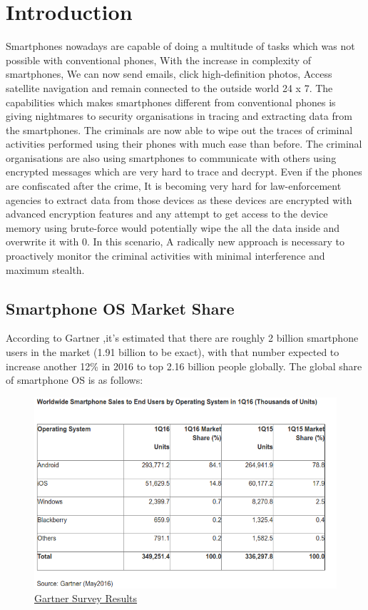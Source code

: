 \chapter{Introduction}

Smartphones nowadays are capable of doing a multitude of tasks which was not possible with conventional phones, With the increase in complexity of smartphones, We can now send emails, click high-definition photos, Access satellite navigation and remain connected to the outside world 24 x 7.  The capabilities which makes smartphones different from conventional phones is giving nightmares to security organisations in tracing and extracting data from the smartphones.  The criminals are now  able to wipe out the traces of criminal activities performed using their phones with much ease than before.  The criminal organisations are also using smartphones to communicate with others using encrypted messages which are very hard to trace and decrypt.  Even if the phones are confiscated after the crime, It is becoming very hard for law-enforcement agencies to extract data from those devices as these devices are encrypted with advanced encryption features and any attempt to get access to the device memory using brute-force would potentially wipe the all the data inside and overwrite it with 0. In this scenario, A radically new approach is necessary to proactively monitor the criminal activities with minimal interference and maximum stealth.

\section{Smartphone OS Market Share}

According to Gartner ,it's estimated that there are roughly 2 billion smartphone users in the market (1.91 billion to be exact), with that number expected to increase another 12\% in 2016 to top 2.16 billion people globally. The global share of smartphone OS is as follows:\\

\begin{figure}[H]
   
    \includegraphics[height=0.5\textheight]{Figures/fig01/gartner}
    \caption{\href{http://www.gartner.com/newsroom/id/3323017} {Gartner Survey Results}}
    \label{gartner}
   
    
  \end{figure}

